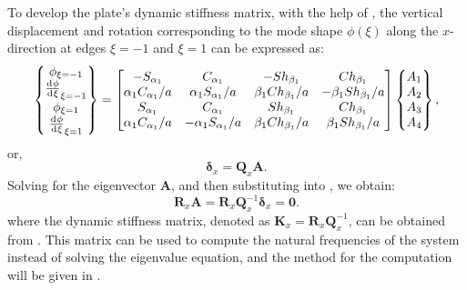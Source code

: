 \documentclass[preprint,12pt]{elsarticle}
\newcommand{\id}{\mathrm{d}\mkern1mu}
\begin{document}
To develop the plate's dynamic stiffness matrix, with the help of , the vertical displacement and rotation corresponding to the mode shape $\phi(\xi)$ along the $x$-direction at edges $\xi = -1$ and $\xi = 1$ can be expressed as:
%
\begin{equation}\label{eq:UBx}
	\begin{split}
		\begin{Bmatrix}
			\phi_{\xi=-1}\\\frac{\id \phi}{\id \xi}_{\xi=-1}\\\phi_{\xi=1}\\\frac{\id \phi}{\id \xi}_{\xi=1}
		\end{Bmatrix}
		= \begin{bmatrix}
			-S_{\alpha_1}&C_{\alpha_1}&-Sh_{\beta_1}&Ch_{\beta_1}\\
			\alpha_1 C_{\alpha_1}/a&\alpha_1S_{\alpha_1}/a&\beta_1Ch_{\beta_1}/a&-\beta_1Sh_{\beta_1}/a\\
			S_{\alpha_1}&C_{\alpha_1}&Sh_{\beta_1}&Ch_{\beta_1}\\
			\alpha_1 C_{\alpha_1}/a&-\alpha_1S_{\alpha_1}/a&\beta_1Ch_{\beta_1}/a&\beta_1Sh_{\beta_1}/a
		\end{bmatrix}
		\begin{Bmatrix}
			A_1\\A_2\\A_3\\A_4
		\end{Bmatrix} ,
	\end{split}
\end{equation}
%
or,
%
\begin{equation}\label{eq:UBx1}
	\mathbf{\delta}_x= \mathbf{Q}_x\mathbf{A}.
\end{equation}
%
Solving for the eigenvector $\mathbf{A}$, and then substituting into , we obtain:
%
\begin{equation}\label{eq:DSM_eqx}
	\mathbf{R}_x \mathbf{A}=\mathbf{R}_x\mathbf{Q}_x^{-1}\mathbf{\delta}_x = \mathbf{0}.
\end{equation}
%
where the dynamic stiffness matrix, denoted as $\mathbf{K}_x = \mathbf{R}_x\mathbf{Q}_x^{-1}$, can be obtained from . 
This matrix can be used to compute the natural frequencies of the system instead of solving the eigenvalue equation, 
and the method for the computation will be given in .
\end{document}
